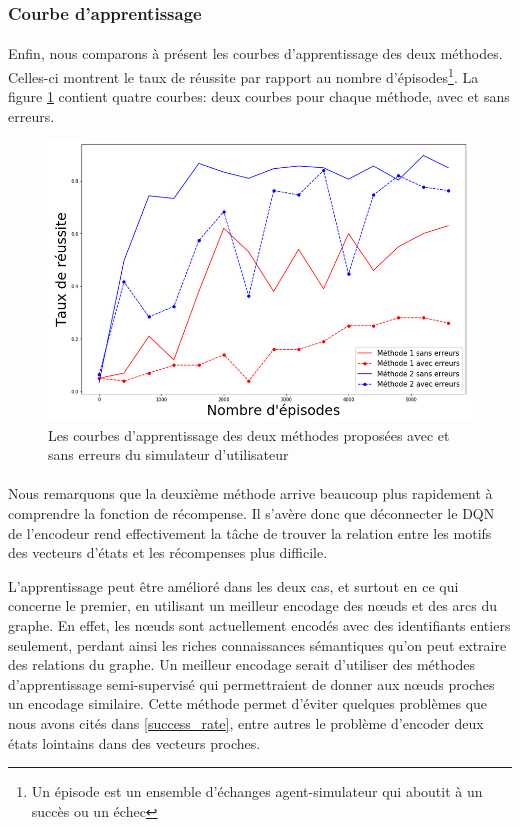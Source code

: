 \subsubsection{Courbe d'apprentissage}
\paragraph{}Enfin, nous comparons à présent les courbes d'apprentissage des deux méthodes. Celles-ci montrent le taux de réussite par rapport au nombre d'épisodes\footnote{Un épisode est un ensemble d'échanges agent-simulateur qui aboutit à un succès ou un échec}. La figure \ref{courbes} contient quatre courbes: deux courbes pour chaque méthode, avec et sans erreurs.
\begin{figure}[H] 
	\centering
	\includegraphics[width=0.95\linewidth]{images/Realisation/DM/courbes.png}
	\caption{Les courbes d'apprentissage des deux méthodes proposées avec et sans erreurs du simulateur d'utilisateur}\label{courbes}
\end{figure}
\paragraph{}Nous remarquons que la deuxième méthode arrive beaucoup plus rapidement à comprendre la fonction de récompense. Il s'avère donc que déconnecter le DQN de l'encodeur rend effectivement la tâche de trouver la relation entre les motifs des vecteurs d'états et les récompenses plus difficile.
\par L'apprentissage peut être amélioré dans les deux cas, et surtout en ce qui concerne le premier, en utilisant un meilleur encodage des n\oe{}uds et des arcs du graphe. En effet, les n\oe{}uds sont actuellement encodés avec des identifiants entiers seulement, perdant ainsi les riches connaissances sémantiques qu'on peut extraire des relations du graphe. Un meilleur encodage serait d'utiliser des méthodes d'apprentissage semi-supervisé qui permettraient de donner aux n\oe{}uds proches un encodage similaire. Cette méthode permet d'éviter quelques problèmes que nous avons cités dans \ref{success_rate}, entre autres le problème d'encoder deux états lointains dans des vecteurs proches.

